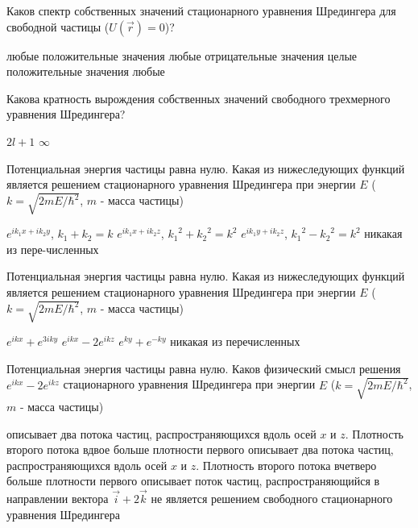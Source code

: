 \documentclass[11pt,a4paper]{exam}
\begin{document}
\begin{questions}

\question Каков спектр собственных значений стационарного уравнения Шредингера для свободной частицы ($U(\vec r) = 0$)?
\begin{choices}
\choice любые положительные значения     
\choice любые отрицательные значения
\choice целые положительные значения        
\choice любые 
\end{choices}

\question Какова кратность вырождения собственных значений свободного трехмерного уравнения Шредингера?
\begin{choices}
\choice $2l + 1$    
\choice $\infty $
\end{choices}

\question Потенциальная энергия частицы равна нулю. Какая из нижеследующих функций является решением стационарного уравнения Шредингера при энергии $E$ ($k = \sqrt {2mE/{\hbar ^2}} $, $m$ - масса частицы)
\begin{choices}
\choice ${e^{i{k_1}x + i{k_2}y}}$, ${k_1} + {k_2} = k$     
\choice ${e^{i{k_1}x + i{k_2}z}}$, ${k_1}^2 + {k_2}^2 = {k^2}$
\choice ${e^{i{k_1}y + i{k_2}z}}$, ${k_1}^2 - {k_2}^2 = {k^2}$      
\choice никакая из пере-численных
\end{choices}

\question Потенциальная энергия частицы равна нулю. Какая из нижеследующих функций является решением стационарного уравнения Шредингера при энергии $E$ ($k = \sqrt {2mE/{\hbar ^2}} $, $m$ - масса частицы)
\begin{choices}
\choice ${e^{ikx}} + {e^{3iky}}$      
\choice ${e^{ikx}} - 2{e^{ikz}}$      
\choice ${e^{ky}} + {e^{ - ky}}$      
\choice никакая из перечисленных
\end{choices}

\question Потенциальная энергия частицы равна нулю. Каков физический смысл решения ${e^{ikx}} - 2{e^{ikz}}$ стационарного уравнения Шредингера при энергии $E$ ($k = \sqrt {2mE/{\hbar ^2}} $, $m$ - масса частицы)
\begin{choices}
\choice описывает два потока частиц, распространяющихся вдоль осей $x$ и $z$. Плотность второго потока вдвое больше плотности первого
\choice описывает два потока частиц, распространяющихся вдоль осей $x$ и $z$. Плотность второго потока вчетверо больше плотности первого
\choice описывает поток частиц, распространяющийся в направлении вектора $\vec i + 2\vec k$
\choice не является решением свободного стационарного уравнения Шредингера
\end{choices}


\end{questions}
\end{document}
